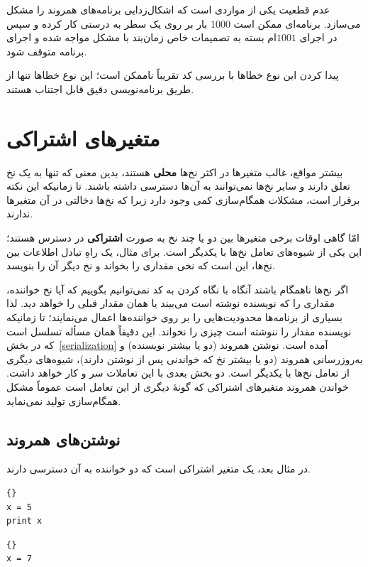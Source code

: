 \documentclass{book}
\begin{document}
    عدم قطعیت یکی از مواردی است که اشکال‌زدایی برنامه‌های همروند را مشکل می‌سازد. برنامه‌ای ممکن است $1000$ بار بر روی یک سطر به درستی 
    کار کرده و سپس در اجرای $1001$ام بسته به تصمیمات خاص زمان‌بند با مشکل مواجه شده و اجرای برنامه متوقف شود. 
    
    پیدا کردن این نوع خطاها با بررسی کد تقریباً ناممکن است؛  این نوع  خطاها تنها از طریق برنامه‌نویسی دقیق قابل اجتناب هستند. 


\section {متغیرهای اشتراکی}
\label{shared}

    بیشتر مواقع، غالب متغیرها در اکثر نخ‌ها \textbf{محلی} هستند، بدین معنی که تنها به یک نخ تعلق دارند و 
    سایر نخ‌ها نمی‌توانند به آن‌ها دسترسی داشته باشند. تا زمانیکه این نکته برقرار است، مشکلات همگام‌سازی کمی وجود دارد زیرا که 
    نخ‌ها دخالتی در آن متغیرها ندارند. 

    امّا گاهی اوقات برخی متغیرها بین دو یا چند نخ به صورت \textbf{اشتراکی} در دسترس هستند؛ این 
    یکی از شیوه‌های تعامل نخ‌ها با یکدیگر است. برای مثال، یک راهِ  تبادل اطلاعات بین نخ‌ها، این است که نخی مقداری را بخواند و نخ دیگر آن را بنویسد. 
    
    اگر نخ‌ها ناهمگام باشند آنگاه با نگاه کردن به کد نمی‌توانیم بگوییم که آیا نخ خواننده، مقداری را که نویسنده نوشته است می‌بیند یا همان مقدار قبلی را خواهد دید. 
    لذا بسیاری از برنامه‌ها محدودیت‌هایی را بر روی خواننده‌ها اعمال می‌نمایند؛ تا زمانیکه نویسنده مقدار را ننوشته است چیزی را نخواند. 
    این دقیقاً همان مسأله تسلسل است که در بخش~\ref{serialization} آمده است. 
    نوشتن همروند (دو یا بیشتر نویسنده) و به‌روزرسانی همروند (دو یا بیشتر نخ که خواندنی پس از نوشتن دارند)، شیوه‌های دیگری از تعامل 
    نخ‌ها با یکدیگر است. دو بخش بعدی با این تعاملات سر و کار خواهد داشت. خواندن همروند متغیرهای اشتراکی که گونهٔ دیگری از این تعامل است 
    عموماً مشکل همگام‌سازی تولید نمی‌نماید. 


\subsection {نوشتن‌های همروند}
در مثال بعد،  یک متغیر اشتراکی است که دو خواننده به آن دسترسی دارند. 

\begin{latin}
\begin{minipage}[t]{2in}
\begin{latin}
\begin{lstlisting}[title=\rl{نخ \lr{A}}]{}
x = 5
print x
\end{lstlisting}
\end{latin}
\end{minipage}
\hfill
\begin{minipage}[t]{2in}
\begin{latin}
\begin{lstlisting}[title=\rl{نخ \lr{B}}]{}
x = 7
\end{lstlisting}
\end{latin}
\end{minipage}
\end{latin}
\end{document}
